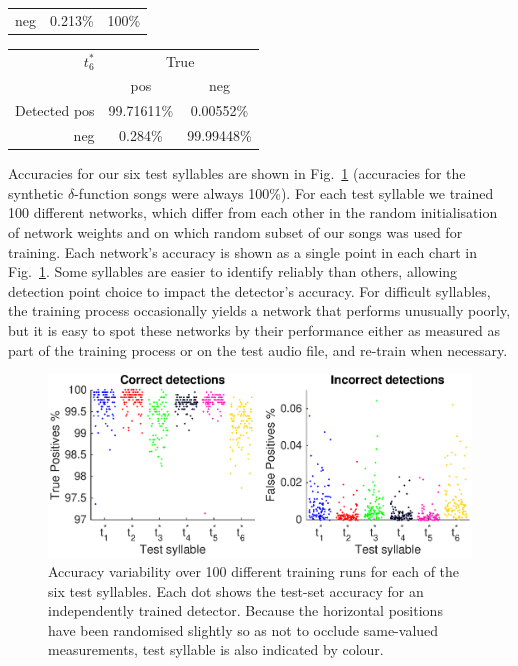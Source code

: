 \documentclass[10pt,letterpaper]{article}
\newcommand\fig[1]{Fig.~\ref{#1}}
\begin{document}
{\begin{tabular}{r|cc}
    neg & 0.213\% & 100\%\\ 
  \end{tabular}
  \vspace{8pt}\par\noindent
  \begin{tabular}{r|cc}
    $t^*_6$ & \multicolumn{2}{c}{True} \\ 
    & pos & neg \\ 
    \hline  Detected pos & 99.71611\% & 0.00552\%\\ 
    neg & 0.284\% & 99.99448\%\\ 
  \end{tabular}
  \vspace{8pt}\par\noindent
}


Accuracies for our six test syllables are shown in
\fig{fig:accuracies} (accuracies for the synthetic $\delta$-function
songs were always 100\%).  For each test syllable we trained
100 different
networks, which differ from each other in the random initialisation of
network weights and on which random subset of our songs was used for
training.  Each network's accuracy is shown as a single point in each
chart in \fig{fig:accuracies}.  Some syllables are easier to identify
reliably than others, allowing detection point choice to impact the
detector's accuracy.  For difficult syllables, the training process
occasionally yields a network that performs unusually poorly, but it
is easy to spot these networks by their performance either as measured
as part of the training process or on the test audio file, and
re-train when necessary.

\begin{figure}
  \includegraphics[width=\textwidth]{Fig3}
  
  \caption{Accuracy variability over 100 different training runs for each
    of the six test syllables.  Each dot shows the test-set accuracy
    for an independently trained detector.  Because the horizontal
    positions have been randomised slightly so as not to occlude same-valued
    measurements, test syllable is also indicated by colour.}
  \label{fig:accuracies}
\end{figure}
\end{document}
